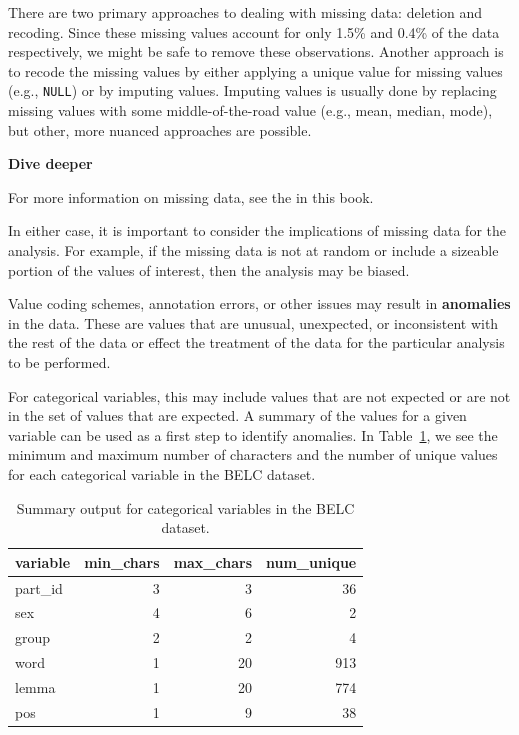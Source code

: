 \documentclass[
  letterpaper,
  DIV=11,
  numbers=noendperiod]{scrreport}
\theoremstyle{definition}
\theoremstyle{remark}
\begin{document}
There are two primary approaches to dealing with missing data: deletion
and recoding. Since these missing values account for only 1.5\% and
0.4\% of the data respectively, we might be safe to remove these
observations. Another approach is to recode the missing values by either
applying a unique value for missing values (e.g., \texttt{NULL}) or by
imputing values. Imputing values is usually done by replacing missing
values with some middle-of-the-road value (e.g., mean, median, mode),
but other, more nuanced approaches are possible.

\begin{tcolorbox}[enhanced jigsaw, leftrule=.75mm, bottomrule=.15mm, opacityback=0, breakable, left=2mm, colback=white, toprule=.15mm, arc=.35mm, rightrule=.15mm]

\textbf{ Dive deeper}

For more information on missing data, see the  in this
book.

\end{tcolorbox}

In either case, it is important to consider the implications of missing
data for the analysis. For example, if the missing data is not at random
or include a sizeable portion of the values of interest, then the
analysis may be biased.

Value coding schemes, annotation errors, or other issues may result in
\textbf{anomalies} in the data. These are values that are unusual,
unexpected, or inconsistent with the rest of the data or effect the
treatment of the data for the particular analysis to be performed.

For categorical variables, this may include values that are not expected
or are not in the set of values that are expected. A summary of the
values for a given variable can be used as a first step to identify
anomalies. In Table~\ref{tbl-aa-belc-skim-categorical}, we see the
minimum and maximum number of characters and the number of unique values
for each categorical variable in the BELC dataset.

\hypertarget{tbl-aa-belc-skim-categorical}{}
\begin{table}
\caption{\label{tbl-aa-belc-skim-categorical}Summary output for categorical variables in the BELC dataset. }\tabularnewline

\centering
\begin{tabular}{l|r|r|r}
\hline
variable & min\_chars & max\_chars & num\_unique\\
\hline
part\_id & 3 & 3 & 36\\
\hline
sex & 4 & 6 & 2\\
\hline
group & 2 & 2 & 4\\
\hline
word & 1 & 20 & 913\\
\hline
lemma & 1 & 20 & 774\\
\hline
pos & 1 & 9 & 38\\
\hline
\end{tabular}
\end{table}
\end{document}
